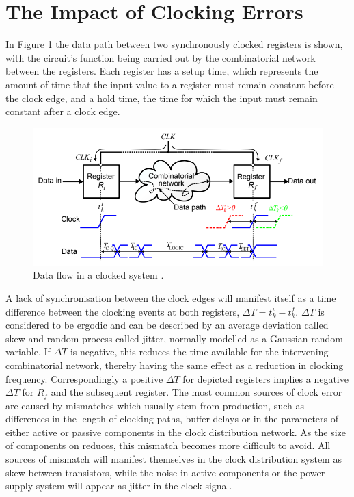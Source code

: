 \section{The Impact of Clocking Errors}
In Figure \ref{fig:eldar_why_precise_clocking} the data path between two synchronously clocked registers is shown, with the circuit's function being carried out by the combinatorial network between the registers.
Each register has a setup time, which represents the amount of time that the input value to a register must remain constant before the clock edge, and a hold time, the time for which the input must remain constant after a clock edge.
\begin{figure}[h]
	\centering
	\includegraphics[scale=0.6]{../eldar_why_precise_clocking}
	\caption[Data flow in a clocked system]{Data flow in a clocked system \cite{zianbetov2013phd}.}
	\label{fig:eldar_why_precise_clocking}
\end{figure}

A lack of synchronisation between the clock edges will manifest itself as a time difference between the clocking events at both registers, $\Delta T = t^i_k - t^f_k$. $\Delta T$ is considered to be ergodic and can be described by an average deviation called skew and random process called jitter, normally modelled as a Gaussian random variable. If $\Delta T$ is negative, this reduces the time available for the intervening combinatorial network, thereby having the same effect as a reduction in clocking frequency. Correspondingly a positive $\Delta T$ for depicted registers implies a negative $\Delta T$ for $R_f$ and the subsequent register. 
The most common sources of clock error are caused by mismatches which usually stem from production, such as differences in the length of clocking paths, buffer delays or in the parameters of either active or passive components in the clock distribution network. As the size of components on  reduces, this mismatch becomes more difficult to avoid. All sources of mismatch will manifest themselves in the clock distribution system as skew between transistors, while the noise in active components or the power supply system will appear as jitter in the clock signal.

